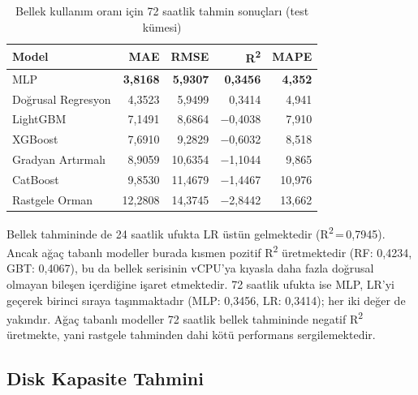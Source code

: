 \begin{table}[htbp]
    \centering
    \caption{Bellek kullanım oranı için 72 saatlik tahmin sonuçları (test kümesi)}
    \label{tab:mem72}
    \begin{tabular}{lrrrr}
        \textbf{Model} & \textbf{MAE} & \textbf{RMSE} & \textbf{R\textsuperscript{2}} & \textbf{MAPE} \\
        \hline
        MLP                 & \textbf{3,8168} & \textbf{5,9307} & \textbf{0,3456} & \textbf{4,352} \\
        Doğrusal Regresyon  & 4,3523 & 5,9499 & 0,3414 & 4,941 \\
        LightGBM            & 7,1491 & 8,6864 & $-$0,4038 & 7,910 \\
        XGBoost             & 7,6910 & 9,2829 & $-$0,6032 & 8,518 \\
        Gradyan Artırmalı   & 8,9059 & 10,6354 & $-$1,1044 & 9,865 \\
        CatBoost            & 9,8530 & 11,4679 & $-$1,4467 & 10,976 \\
        Rastgele Orman      & 12,2808 & 14,3745 & $-$2,8442 & 13,662 \\
    \end{tabular}
\end{table}

Bellek tahmininde de 24 saatlik ufukta LR üstün gelmektedir (R\textsuperscript{2}\,=\,0{,}7945).
Ancak ağaç tabanlı modeller burada kısmen pozitif R\textsuperscript{2} üretmektedir (RF: 0{,}4234, GBT: 0{,}4067), bu da bellek serisinin vCPU'ya kıyasla daha fazla doğrusal olmayan bileşen içerdiğine işaret etmektedir.
72 saatlik ufukta ise MLP, LR'yi geçerek birinci sıraya taşınmaktadır (MLP: 0{,}3456, LR: 0{,}3414); her iki değer de yakındır.
Ağaç tabanlı modeller 72 saatlik bellek tahmininde negatif R\textsuperscript{2} üretmekte, yani rastgele tahminden dahi kötü performans sergilemektedir.


\subsection{Disk Kapasite Tahmini}

